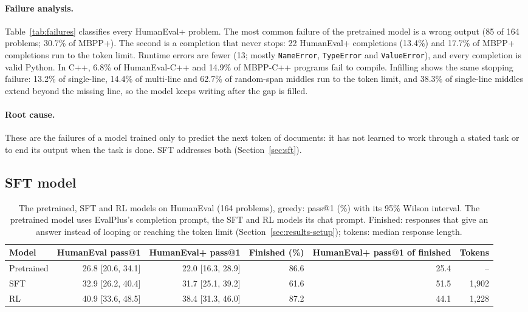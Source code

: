 \documentclass[sigconf,nonacm,balance=false]{acmart}
\begin{document}
\paragraph{Failure analysis.} Table~\ref{tab:failures} classifies every HumanEval+ problem. The most common failure of
the pretrained model is a wrong output (85 of 164 problems; 30.7\% of MBPP+). The second is a completion that never
stops: 22 HumanEval+ completions (13.4\%) and 17.7\% of MBPP+ completions run to the token limit. Runtime errors are
fewer (13; mostly \texttt{NameError}, \texttt{TypeError} and \texttt{ValueError}), and every completion is valid
Python. In C++, 6.8\% of HumanEval-C++ and 14.9\% of MBPP-C++ programs fail to compile. Infilling shows the same
stopping failure: 13.2\% of single-line, 14.4\% of multi-line and 62.7\% of random-span middles run to the token
limit, and 38.3\% of single-line middles extend beyond the missing line, so the model keeps writing after the gap is
filled.

\paragraph{Root cause.} These are the failures of a model trained only to predict the next token of documents: it
has not learned to work through a stated task or to end its output when the task is done. SFT addresses both
(Section~\ref{sec:sft}).

\subsection{SFT model}
\label{sec:results-sft}

\begin{table}
  \caption{The pretrained, SFT and RL models on HumanEval (164 problems), greedy: pass@1 (\%) with its 95\% Wilson
  interval. The pretrained model uses EvalPlus's completion prompt, the SFT and RL models its chat prompt. Finished:
  responses that give an answer instead of looping or reaching the token limit (Section~\ref{sec:results-setup});
  tokens: median response length.}
  \label{tab:post-humaneval}
  \small
  \begin{tabular}{lrrrrr}
    \toprule
    Model & HumanEval pass@1 & HumanEval+ pass@1 & Finished (\%) & HumanEval+ pass@1 of finished & Tokens \\
    \midrule
    Pretrained & 26.8 [20.6, 34.1] & 22.0 [16.3, 28.9] & 86.6 & 25.4 & -- \\
    SFT & 32.9 [26.2, 40.4] & 31.7 [25.1, 39.2] & 61.6 & 51.5 & 1,902 \\
    RL & 40.9 [33.6, 48.5] & 38.4 [31.3, 46.0] & 87.2 & 44.1 & 1,228 \\
    \bottomrule
  \end{tabular}
\end{table}
\end{document}
